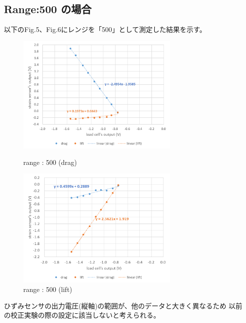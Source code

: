 \documentclass[twocolumn,a4j]{jsarticle}
\begin{document}
\subsection{Range:500 の場合}
以下のFig.5、Fig.6にレンジを「500」として測定した結果を示す。
\begin{figure}[htbp]
    \footnotesize
    \begin{center}
        \includegraphics[width=80mm]{../images/500_drag.png}
        \caption{range : 500 (drag)}
        \includegraphics[width=80mm]{../images/500_lift.png}
        \caption{range : 500 (lift)}
    \end{center}
\end{figure}\par
ひずみセンサの出力電圧(縦軸)の範囲が、他のデータと大きく異なるため
以前の校正実験の際の設定に該当しないと考えられる。
\end{document}

